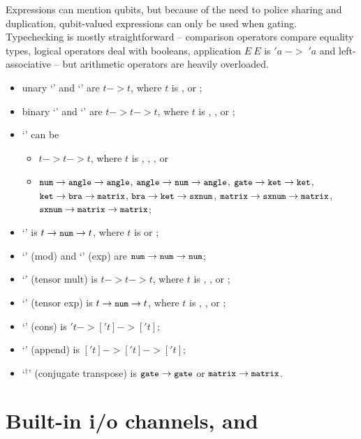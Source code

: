 Expressions can mention qubits, but because of the need to police sharing and duplication, qubit-valued expressions can only be used when gating. Typechecking is mostly straightforward -- comparison operators compare equality types, logical operators deal with booleans, application $E\ E$ is $'a\;->\;'a$ and left-associative -- but arithmetic operators are heavily overloaded.
\begin{itemize}
\item unary `\verbtt{+}' and `\verbtt{-}' are $t->t$, where $t$ is ,  or ;
\item binary `\verbtt{+}' and `\verbtt{-}' are $t->t->t$, where $t$ is , ,  or ;
\item `\verbtt{*}' can be 
\begin{itemize}
	\item $t->t->t$, where $t$ is , , ,  or 
	\item $\texttt{\small{}num}->\texttt{\small{}angle}->\texttt{\small{}angle}$, $\texttt{\small{}angle}->\texttt{\small{}num}->\texttt{\small{}angle}$, $\texttt{\small{}gate}->\texttt{\small{}ket}->\texttt{\small{}ket}$, $\texttt{\small{}ket}->\texttt{\small{}bra}->\texttt{\small{}matrix}$, $\texttt{\small{}bra}->\texttt{\small{}ket}->\texttt{\small{}sxnum}$, $\texttt{\small{}matrix}->\texttt{\small{}sxnum}->\texttt{\small{}matrix}$, $\texttt{\small{}sxnum}->\texttt{\small{}matrix}->\texttt{\small{}matrix}$;
\end{itemize}
\item `\verbtt{/}' is $t->\texttt{\small{}num}->t$, where $t$ is  or ;
\item `\verbtt{\%}' (mod) and `\verbtt{**}' (exp) are $\texttt{\small{}num}->\texttt{\small{}num}->\texttt{\small{}num}$;
\item `' (tensor mult) is $t->t->t$, where $t$ is , ,  or ;
\item `' (tensor exp) is $t->\texttt{\small{}num}->t$, where $t$ is , ,  or ;
\item `\verbtt{::}' (cons) is $'t->['t]->['t]$;
\item `' (append) is $['t]->['t]->['t]$;
\item `\ensuremath{^{\dag}}' (conjugate transpose) is $\texttt{\small{}gate}->\texttt{\small{}gate}$ or $\texttt{\small{}matrix}->\texttt{\small{}matrix}$.
\end{itemize}


\section{Built-in i/o channels,  and }

